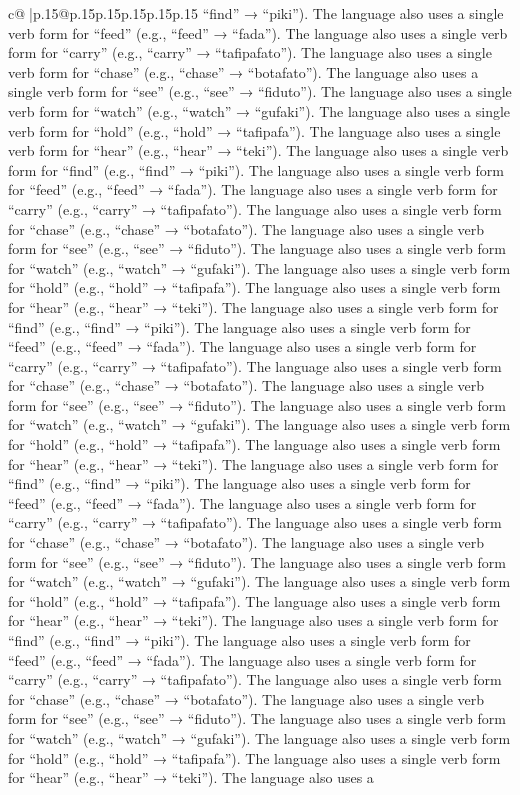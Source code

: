 \documentclass{article}
\begin{document}
{\begin{supertabular}{c@{$\;$}|p{.15\linewidth}@{}p{.15\linewidth}p{.15\linewidth}p{.15\linewidth}p{.15\linewidth}p{.15\linewidth}}
{{{“find” → “piki”). The language also uses a single verb form for “feed” (e.g., “feed” → “fada”). The language also uses a single verb form for “carry” (e.g., “carry” → “tafipafato”). The language also uses a single verb form for “chase” (e.g., “chase” → “botafato”). The language also uses a single verb form for “see” (e.g., “see” → “fiduto”). The language also uses a single verb form for “watch” (e.g., “watch” → “gufaki”). The language also uses a single verb form for “hold” (e.g., “hold” → “tafipafa”). The language also uses a single verb form for “hear” (e.g., “hear” → “teki”). The language also uses a single verb form for “find” (e.g., “find” → “piki”). The language also uses a single verb form for “feed” (e.g., “feed” → “fada”). The language also uses a single verb form for “carry” (e.g., “carry” → “tafipafato”). The language also uses a single verb form for “chase” (e.g., “chase” → “botafato”). The language also uses a single verb form for “see” (e.g., “see” → “fiduto”). The language also uses a single verb form for “watch” (e.g., “watch” → “gufaki”). The language also uses a single verb form for “hold” (e.g., “hold” → “tafipafa”). The language also uses a single verb form for “hear” (e.g., “hear” → “teki”). The language also uses a single verb form for “find” (e.g., “find” → “piki”). The language also uses a single verb form for “feed” (e.g., “feed” → “fada”). The language also uses a single verb form for “carry” (e.g., “carry” → “tafipafato”). The language also uses a single verb form for “chase” (e.g., “chase” → “botafato”). The language also uses a single verb form for “see” (e.g., “see” → “fiduto”). The language also uses a single verb form for “watch” (e.g., “watch” → “gufaki”). The language also uses a single verb form for “hold” (e.g., “hold” → “tafipafa”). The language also uses a single verb form for “hear” (e.g., “hear” → “teki”). The language also uses a single verb form for “find” (e.g., “find” → “piki”). The language also uses a single verb form for “feed” (e.g., “feed” → “fada”). The language also uses a single verb form for “carry” (e.g., “carry” → “tafipafato”). The language also uses a single verb form for “chase” (e.g., “chase” → “botafato”). The language also uses a single verb form for “see” (e.g., “see” → “fiduto”). The language also uses a single verb form for “watch” (e.g., “watch” → “gufaki”). The language also uses a single verb form for “hold” (e.g., “hold” → “tafipafa”). The language also uses a single verb form for “hear” (e.g., “hear” → “teki”). The language also uses a single verb form for “find” (e.g., “find” → “piki”). The language also uses a single verb form for “feed” (e.g., “feed” → “fada”). The language also uses a single verb form for “carry” (e.g., “carry” → “tafipafato”). The language also uses a single verb form for “chase” (e.g., “chase” → “botafato”). The language also uses a single verb form for “see” (e.g., “see” → “fiduto”). The language also uses a single verb form for “watch” (e.g., “watch” → “gufaki”). The language also uses a single verb form for “hold” (e.g., “hold” → “tafipafa”). The language also uses a single verb form for “hear” (e.g., “hear” → “teki”). The language also uses a }}}
\end{supertabular}}
\end{document}
